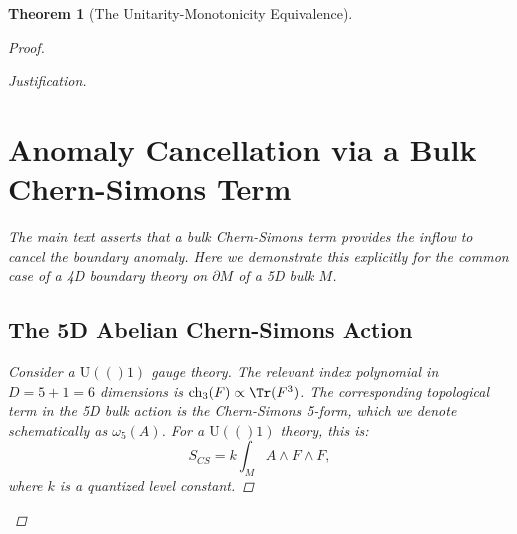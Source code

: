 \documentclass[11pt, letterpaper]{report}
\theoremstyle{plain} %
\newtheorem{theorem}{Theorem}[chapter]
\theoremstyle{definition} %
\theoremstyle{remark} %
\newcommand{\BulkM}{M}
\newcommand{\BoundaryM}{\partial\BulkM}
\newcommand{\U}[1]{\mathrm{U}(#1)}
\begin{document}
\begin{theorem}[The Unitarity-Monotonicity Equivalence]
\begin{proof}
\begin{proof}[Justification]
\section{Anomaly Cancellation via a Bulk Chern-Simons Term}
\label{app:chern_simons_cancellation}

The main text asserts that a bulk Chern-Simons term provides the inflow to cancel the boundary anomaly. Here we demonstrate this explicitly for the common case of a 4D boundary theory on $\BoundaryM$ of a 5D bulk $\BulkM$.

\subsection{The 5D Abelian Chern-Simons Action}
Consider a $\U(1)$ gauge theory. The relevant index polynomial in $D=5+1=6$ dimensions is $\text{ch}_3(F) \propto \Tr(F^3)$. The corresponding topological term in the 5D bulk action is the Chern-Simons 5-form, which we denote schematically as $\omega_5(A)$. For a $\U(1)$ theory, this is:
\begin{equation}
    S_{CS} = k \int_{\BulkM} A \wedge F \wedge F,
\end{equation}
where $k$ is a quantized level constant.


\end{proof}
\end{proof}
\end{theorem}
\end{document}
